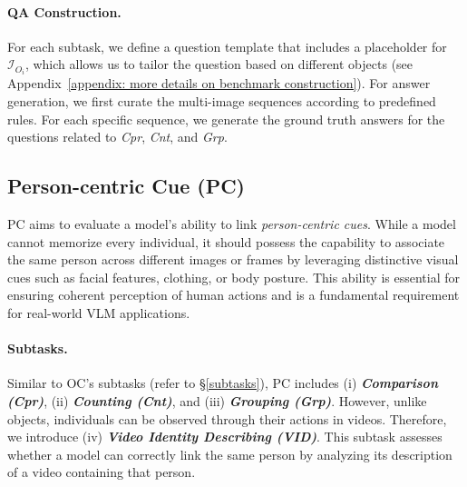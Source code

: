 \paragraph{QA Construction.}
For each subtask, we define a question template that includes a placeholder for \( \mathcal{I}_{O_i} \), which allows us to tailor the question based on different objects (see Appendix~\ref{appendix: more details on benchmark construction}). For answer generation, we first curate the multi-image sequences according to predefined rules. For each specific sequence, we generate the ground truth answers for the questions related to \textit{Cpr}, \textit{Cnt}, and \textit{Grp}.




\subsection{Person-centric Cue (PC)}
\label{pc}
PC aims to evaluate a model's ability to link \textit{person-centric cues}. While a model cannot memorize every individual, it should possess the capability to associate the same person across different images or frames by leveraging distinctive visual cues such as facial features, clothing, or body posture. This ability is essential for ensuring coherent perception of human actions and is a fundamental requirement for real-world VLM applications.

\paragraph{Subtasks.} 
Similar to OC's subtasks (refer to \S\ref{subtasks}), PC includes (i) \textbf{\textit{Comparison (Cpr)}}, (ii) \textbf{\textit{Counting (Cnt)}}, and (iii) \textbf{\textit{Grouping (Grp)}}. However, unlike objects, individuals can be observed through their actions in videos. Therefore, we introduce (iv) \textbf{\textit{Video Identity Describing (VID)}}. This subtask assesses whether a model can correctly link the same person by analyzing its description of a video containing that person.


